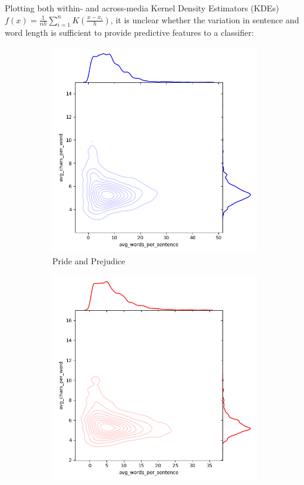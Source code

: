 \documentclass{article}
\begin{document}
\begin{titlepage}
Plotting both within- and across-media Kernel Density Estimators (KDEs) $f(x) = \frac{1}{nh} \sum_{i=1}^{n} K\left(\frac{x - x_i}{h}\right)$,
it is unclear whether the variation in sentence and word length is sufficient to provide predictive features to a classifier:

\begin{figure}[H]
    \centering
    \caption{Selected KDE Plots}
    \begin{subfigure}[b]{0.45\textwidth}
        \centering
        \includegraphics[width=\textwidth]{images/3d_kde_test_0.png}
        \caption{Pride and Prejudice}
        \label{fig:subfig1}
    \end{subfigure}
    \hfill
    \begin{subfigure}[b]{0.45\textwidth}
        \centering
        \includegraphics[width=\textwidth]{images/3d_kde_test_1.png}

\end{subfigure}
\end{figure}
\end{titlepage}
\end{document}
